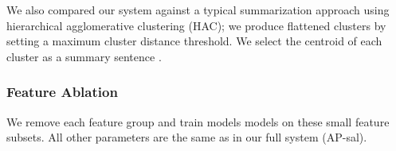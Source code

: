 
We also compared our system against a typical summarization approach using
hierarchical agglomerative clustering (HAC); we produce flattened clusters by setting a maximum cluster 
distance threshold. We  select the centroid of each
cluster as a summary sentence  \cite{??}. 

\subsubsection{Feature Ablation}

We remove each feature group and train models models on these small 
feature subsets. All other parameters are the same as in our full system 
(AP-sal).



